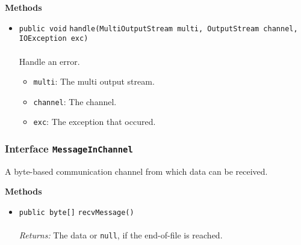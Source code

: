 \textbf{\sffamily Methods}
\begin{itemize}
\item \lstinline|public void| \lstinline|handle|\lstinline|(MultiOutputStream multi, OutputStream channel, IOException exc)|\\ \\[-0.6em]
Handle an error.
\begin{itemize}
\item \lstinline|multi|: The multi output stream.
\item \lstinline|channel|: The channel.
\item \lstinline|exc|: The exception that occured.
\end{itemize}



\end{itemize}

\subsubsection{Interface \lstinline|MessageInChannel|}
A byte-based communication channel from which data can be received. \\
\noindent\begin{minipage}[t]{5cm}
\vspace{0.3em}
\hspace*{2em}
\vspace{0.3em}
\end{minipage}





\textbf{\sffamily Methods}
\begin{itemize}
\item \lstinline|public byte[]| \lstinline|recvMessage|\lstinline|()|\\ \\[-0.6em]
\emph{Returns:} The data or \lstinline|null|, if the end-of-file is reached.



\end{itemize}

